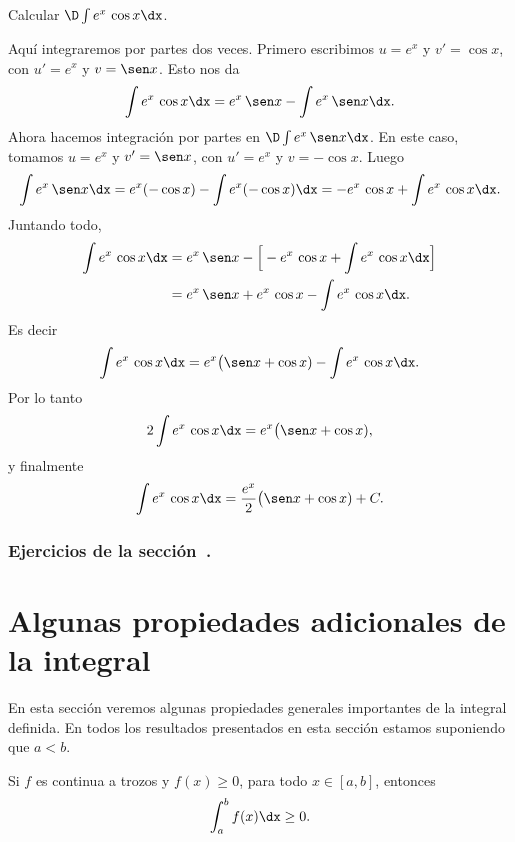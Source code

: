 \begin{example}
  Calcular $\D \int e^x\, \cos x \dx$.

  Aquí integraremos por partes dos veces. Primero escribimos
  $u=e^x$ y $v'=\cos x$, con $u'=e^x$ y $v=\sen x$. Esto nos da
  \[
  \int e^x\,\cos x \dx 
  = e^x \,\sen x - \int e^x \,\sen x\dx .
  \]
  Ahora hacemos integración por partes en $\D \int e^x \, \sen x \dx$.
  En este caso, tomamos $u=e^x$ y $v'=\sen x$, con $u'=e^x$ y $v=-\cos x$. Luego
  \[
  \int e^x\,\sen x \dx 
  = e^x (-\cos x) - \int e^x (-\cos x)\dx 
  = -e^x \,\cos x + \int e^x \, \cos x \dx .
  \]
  Juntando todo,
  \begin{align*}
    \int e^x\,\cos x \dx 
    &= e^x \,\sen x -\Big[-e^x \,\cos x + \int e^x \, \cos x \dx \Big]\\
    &= e^x \,\sen x +e^x \,\cos x - \int e^x \, \cos x \dx .
  \end{align*}
  Es decir
  \[
    \int e^x\,\cos x \dx 
    = e^x\big(\sen x+\cos x) - 
    \int e^x\,\cos x \dx .
  \]
  Por lo tanto 
  \[
    2\int e^x\,\cos x \dx 
    = e^x\big(\sen x+\cos x),
  \]
  y finalmente 
  \[
    \int e^x\,\cos x \dx 
    = \frac{e^x}2\big(\sen x+\cos x) + C.
  \]
\end{example}



\subsubsection*{Ejercicios de la sección~.}

\begin{enumerate}
  
\end{enumerate}  


\section{Algunas propiedades adicionales de la integral}

En esta sección veremos algunas propiedades generales importantes de la integral definida. En todos los resultados presentados en esta sección estamos suponiendo que $a<b$.

\begin{lemma}\label{L:integral ge 0}
  Si $f$ es continua a trozos y $f(x)\ge 0$, para todo $x\in [a,b]$, entonces 
  \[
  \int_a^b f(x)\dx \ge 0.
  \]
\end{lemma}

